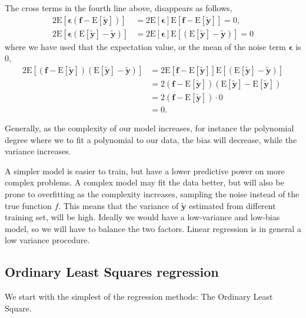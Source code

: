 \documentclass[a4paper,10pt,english]{article}
\begin{document}
The cross terms in the fourth line above, disappears as follows,
\begin{align*}
2\mathrm{{E}}[\bm{{\epsilon}}(\bm{{f}}-\mathrm{{E}}[\bm{{\tilde y}}])] &= 2\mathrm{{E}}[\bm{{\epsilon}}]\mathrm{{E}}[\bm{{f}}-\mathrm{{E}}[\bm{{\tilde y}}]] = 0,\\
2\mathrm{{E}}[\bm{{\epsilon}}(\mathrm{{E}}[\bm{{\tilde y}}]- \bm{{\tilde y}})] &= 2\mathrm{{E}}[\bm{{\epsilon}}]\mathrm{{E}}[(\mathrm{{E}}[\bm{{\tilde y}}]- \bm{{\tilde y}})] = 0
\end{align*}
where we have used that the expectation value, or the mean of the noise term $\bm{{\bm{{\epsilon}}}}$ is 0,
\begin{align*}
2\mathrm{{E}}[(\bm{{f}} - \mathrm{{E}}[\bm{{\tilde y}}])(\mathrm{{E}}[\bm{{\tilde y}}]-\bm{{\tilde y}})] &= 2\mathrm{{E}}[\bm{{f}} - \mathrm{{E}}[\bm{{\tilde y}}]]\mathrm{{E}}[(\mathrm{{E}}[\bm{{\tilde y}}]-\bm{{\tilde y}})]\\
	&= 2(\bm{{f}} - \mathrm{{E}}[\bm{{\tilde y}}])(\mathrm{{E}}[\bm{{\tilde y}}]-\mathrm{{E}}[\bm{{\tilde y}}])\\
	&= 2(\bm{{f}} - \mathrm{{E}}[\bm{{\tilde y}}])\cdot 0\\
	& = 0.
\end{align*}

Generally, as the complexity of our model increases, for instance the polynomial degree where we to fit a polynomial to our data, the bias will decrease, while the variance increases.

A simpler model is easier to train, but have a lower predictive power on more complex problems. A complex model may fit the data better, but will also be prone to overfitting as the complexity increases, sampling the noise instead of the true function $f$. This means that the variance of $\bm{{\tilde y}}$ estimated from different training set, will be high. Ideally we would have a low-variance and low-bias model, so we will have to balance the two factors. Linear regression is in general a low variance procedure. 

%
%
\subsection{Ordinary Least Squares regression}
We start with the simplest of the regression methods: The Ordinary Least Square.
\end{document}
